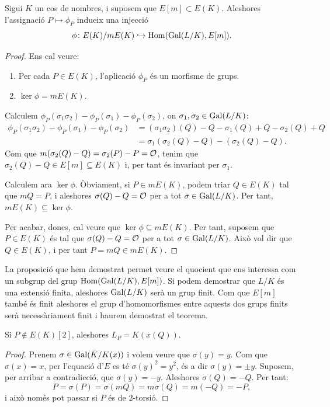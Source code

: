 \begin{proposition}
Sigui $K$ un cos de nombres, i suposem que $E[m] \subset E(K)$. Aleshores l'assignació $P\mapsto \phi_P$ indueix una injecció
\[
\phi\colon E(K)/mE(K)\hookrightarrow \operatorname{Hom}(\operatorname{Gal}(L/K), E[m]).
\]
\end{proposition}
\begin{proof}
Ens cal veure:
\begin{enumerate}
    \item Per cada $P\in E(K)$, l'aplicació $\phi_P$ és un morfisme de grups.
    \item $\ker \phi=mE(K)$.
\end{enumerate}
Calculem $\phi_P(\sigma_1\sigma_2)-\phi_P(\sigma_1)-\phi_P(\sigma_2)$, on $\sigma_1,\sigma_2\in\operatorname{Gal}(L/K)$:
\begin{align*}
\phi_P(\sigma_1\sigma_2)-\phi_P(\sigma_1)-\phi_P(\sigma_2)&=(\sigma_1\sigma_2)(Q)-Q - \sigma_1(Q)+Q-\sigma_2(Q)+Q\\
&=\sigma_1(\sigma_2(Q)-Q) - (\sigma_2(Q)-Q).
\end{align*}
Com que $m(\sigma_2(Q)-Q) = \sigma_2(P)-P = \mathcal{O}$,
tenim que $\sigma_2(Q)-Q\in E[m]\subseteq E(K)$ i, per tant és invariant per $\sigma_1$.

Calculem ara $\ker\phi$. Òbviament, si $P\in mE(K)$, podem triar $Q\in E(K)$ tal que $mQ=P$, i aleshores $\sigma(Q)-Q=\mathcal{O}$ per a tot $\sigma\in \operatorname{Gal}(L/K)$. Per tant, $mE(K)\subseteq \ker\phi$.

Per acabar, doncs, cal veure que $\ker\phi\subseteq mE(K)$. Per tant, suposem que $P\in E(K)$ és tal que $\sigma(Q)-Q=\mathcal{O}$ per a tot $\sigma\in \operatorname{Gal}(L/K)$. Això vol dir que $Q\in E(K)$, i per tant $P=mQ\in mE(K)$.
\end{proof}

La proposició que hem demostrat permet veure el quocient que ens interessa com un subgrup del grup $\operatorname{Hom}(\operatorname{Gal}(L/K),E[m])$. Si podem demostrar que $L/K$ és una extensió finita, aleshores $\operatorname{Gal}(L/K)$ serà un grup finit. Com que $E[m]$ també és finit aleshores el grup d'homomorfismes entre aquests dos grups finits serà necessàriament finit i haurem demostrat el teorema.

\begin{lemma}
Si $P\not\in E(K)[2]$, aleshores $L_P=K(x(Q))$.
\end{lemma}
\begin{proof}
Prenem $\sigma\in \operatorname{Gal}(\bar K/K(x))$ i volem veure que $\sigma(y)=y$. Com que $\sigma(x)=x$, per l'equació d'$E$ es té $\sigma(y)^2=y^2$, és a dir $\sigma(y)=\pm y$. Suposem, per arribar a contradicció, que $\sigma(y)=-y$. Aleshores $\sigma(Q)=-Q$. Per tant:
\[
P = \sigma(P) = \sigma(mQ)= m\sigma(Q)=m(-Q) = -P,
\]
i això només pot passar si $P$ és de $2$-torsió.
\end{proof}

